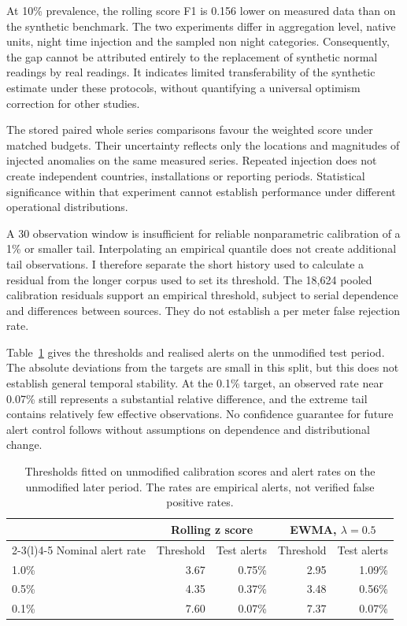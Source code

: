 \documentclass[11pt,a4paper]{article}
\begin{document}
At 10\% prevalence, the rolling score F1 is 0.156 lower on measured data than on the synthetic benchmark. The two experiments differ in aggregation level, native units, night time injection and the sampled non night categories. Consequently, the gap cannot be attributed entirely to the replacement of synthetic normal readings by real readings. It indicates limited transferability of the synthetic estimate under these protocols, without quantifying a universal optimism correction for other studies.

The stored paired whole series comparisons favour the weighted score under matched budgets. Their uncertainty reflects only the locations and magnitudes of injected anomalies on the same measured series. Repeated injection does not create independent countries, installations or reporting periods. Statistical significance within that experiment cannot establish performance under different operational distributions.



A 30 observation window is insufficient for reliable nonparametric calibration of a 1\% or smaller tail. Interpolating an empirical quantile does not create additional tail observations. I therefore separate the short history used to calculate a residual from the longer corpus used to set its threshold. The 18,624 pooled calibration residuals support an empirical threshold, subject to serial dependence and differences between sources. They do not establish a per meter false rejection rate.

Table~\ref{tab:alerts} gives the thresholds and realised alerts on the unmodified test period. The absolute deviations from the targets are small in this split, but this does not establish general temporal stability. At the 0.1\% target, an observed rate near 0.07\% still represents a substantial relative difference, and the extreme tail contains relatively few effective observations. No confidence guarantee for future alert control follows without assumptions on dependence and distributional change.

\begin{table}[tb]\centering\small
\caption{Thresholds fitted on unmodified calibration scores and alert rates on the unmodified later period. The rates are empirical alerts, not verified false positive rates.}\label{tab:alerts}
\begin{tabular}{@{}lrrrr@{}}\toprule
 & \multicolumn{2}{c}{Rolling z score} & \multicolumn{2}{c}{EWMA, $\lambda=0.5$}\\
\cmidrule(lr){2-3}\cmidrule(l){4-5}
Nominal alert rate & Threshold & Test alerts & Threshold & Test alerts\\\midrule
1.0\% & 3.67 & 0.75\% & 2.95 & 1.09\%\\
0.5\% & 4.35 & 0.37\% & 3.48 & 0.56\%\\
0.1\% & 7.60 & 0.07\% & 7.37 & 0.07\%\\\bottomrule
\end{tabular}
\end{table}
\end{document}

